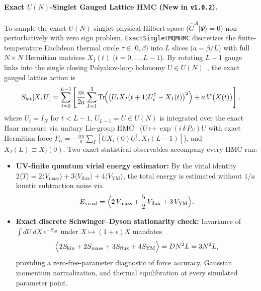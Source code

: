 \documentclass[11pt,a4paper]{article}
\DeclareMathOperator{\Tr}{Tr}
\begin{document}
\paragraph{Exact $U(N)$-Singlet Gauged Lattice HMC (New in \texttt{v1.0.2}).}
To sample the exact $U(N)$-singlet physical Hilbert space ($\hat{G}^A|\Psi\rangle = 0$) non-perturbatively with zero sign problem, \texttt{ExactSingletMQMHMC} discretizes the finite-temperature Euclidean thermal circle $\tau \in [0, \beta)$ into $L$ slices ($a = \beta/L$) with full $N\times N$ Hermitian matrices $X_I(t)$ ($t=0,\dots,L-1$). By rotating $L-1$ gauge links into the single closing Polyakov-loop holonomy $U \in U(N)$~\cite{Kawahara2007}, the exact gauged lattice action is
\begin{equation}
  S_{\mathrm{lat}}[X, U] = \sum_{t=0}^{L-1} \left[
    \frac{m}{2a}\sum_{I=1}^{3} \Tr\!\Bigl(\bigl(U_t X_I(t+1) U_t^\dagger - X_I(t)\bigr)^2\Bigr)
    + a\,V\bigl(X(t)\bigr)
  \right],
  \label{eq:Slat_hmc}
\end{equation}
where $U_t = I_N$ for $t < L-1$, $U_{L-1} = U \in U(N)$ is integrated over the exact Haar measure via unitary Lie-group HMC~\cite{Duane1987} ($U \mapsto \exp(i\,\delta\,P_U)U$ with exact Hermitian force $F_U = -\frac{im}{a}\sum_I [U X_I(0) U^\dagger, X_I(L-1)]$), and $X_I(L) \equiv X_I(0)$. Two exact statistical observables accompany every HMC run:
\begin{itemize}
  \item \textbf{UV-finite quantum virial energy estimator:} By the virial identity $2\langle T\rangle = 2\langle V_{\mathrm{mass}}\rangle + 3\langle V_{\mathrm{flux}}\rangle + 4\langle V_{\mathrm{YM}}\rangle$, the total energy is estimated without $1/a$ kinetic subtraction noise via
  \begin{equation}
    E_{\mathrm{virial}} = \Bigl\langle 2\,V_{\mathrm{mass}} + \frac{5}{2}\,V_{\mathrm{flux}} + 3\,V_{\mathrm{YM}} \Bigr\rangle.
    \label{eq:Evirial}
  \end{equation}
  \item \textbf{Exact discrete Schwinger--Dyson stationarity check:} Invariance of $\int dU\,dX\,e^{-S_{\mathrm{lat}}}$ under $X \mapsto (1+\epsilon)X$ mandates
  \begin{equation}
    \Bigl\langle 2 S_{\mathrm{kin}} + 2 S_{\mathrm{mass}} + 3 S_{\mathrm{flux}} + 4 S_{\mathrm{YM}} \Bigr\rangle = D N^2 L = 3 N^2 L,
    \label{eq:SD_id}
  \end{equation}
  providing a zero-free-parameter diagnostic of force accuracy, Gaussian momentum normalization, and thermal equilibration at every simulated parameter point.
\end{itemize}
\end{document}
